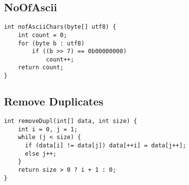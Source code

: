 \subsection*{NoOfAscii}
\begin{verbatim}
int nofAsciiChars(byte[] utf8) {
    int count = 0;
    for (byte b : utf8)
        if ((b >> 7) == 0b00000000)
            count++;
    return count;
}
\end{verbatim}
\subsection*{Remove Duplicates}
\begin{verbatim}
int removeDupl(int[] data, int size) {
    int i = 0, j = 1;
    while (j < size) {
      if (data[i] != data[j]) data[++i] = data[j++];
      else j++;
    }
    return size > 0 ? i + 1 : 0;
}
\end{verbatim}
